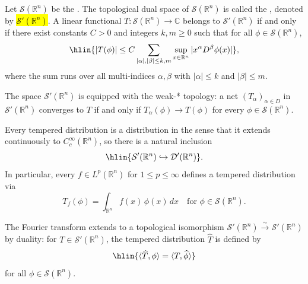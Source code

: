 \begin{definition} \label{definition:tempered_distributions}
    Let $\mathcal{S}(\mathbb{R}^n)$ be the . The topological dual space of $\mathcal{S}(\mathbb{R}^n)$ is called the , denoted by \hl{$\mathcal{S}'(\mathbb{R}^n)$}. A linear functional $T : \mathcal{S}(\mathbb{R}^n) \to \mathbb{C}$ belongs to $\mathcal{S}'(\mathbb{R}^n)$ if and only if there exist constants $C > 0$ and integers $k, m \geq 0$ such that for all $\phi \in \mathcal{S}(\mathbb{R}^n)$,
    $$\hlin{|T(\phi)| \leq C \sum_{|\alpha|, |\beta| \leq k, m} \sup_{x \in \mathbb{R}^n} |x^\alpha D^\beta \phi(x)|},$$
    where the sum runs over all multi-indices $\alpha, \beta$ with $|\alpha| \leq k$ and $|\beta| \leq m$.

    The space $\mathcal{S}'(\mathbb{R}^n)$ is equipped with the weak-* topology: a net $(T_\alpha)_{\alpha \in D}$ in $\mathcal{S}'(\mathbb{R}^n)$ converges to $T$ if and only if $T_\alpha(\phi) \to T(\phi)$ for every $\phi \in \mathcal{S}(\mathbb{R}^n)$.

    Every tempered distribution is a distribution in the sense that it extends continuously to $C_c^\infty(\mathbb{R}^n)$, so there is a natural inclusion
    $$\hlin{\mathcal{S}'(\mathbb{R}^n) \hookrightarrow \mathcal{D}'(\mathbb{R}^n)}.$$
    In particular, every $f \in L^p(\mathbb{R}^n)$ for $1 \leq p \leq \infty$ defines a tempered distribution via
    $$T_f(\phi) = \int_{\mathbb{R}^n} f(x)\,\phi(x)\,dx \quad \text{for } \phi \in \mathcal{S}(\mathbb{R}^n).$$

    The Fourier transform extends to a topological isomorphism $\mathcal{S}'(\mathbb{R}^n) \xrightarrow{\,\sim\,} \mathcal{S}'(\mathbb{R}^n)$ by duality: for $T \in \mathcal{S}'(\mathbb{R}^n)$, the tempered distribution $\widehat{T}$ is defined by
    $$\hlin{\langle \widehat{T}, \phi \rangle = \langle T, \widehat{\phi} \rangle}$$
    for all $\phi \in \mathcal{S}(\mathbb{R}^n)$.
\end{definition}
